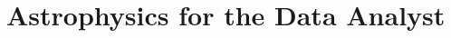 \chapter{Astrophysics for the Data Analyst}\label{ch:T2}

\providecommand{\TwEmriMc}{}\renewcommand{\TwEmriMc}{39.81}
\providecommand{\TwEmrifisco}{}\renewcommand{\TwEmrifisco}{0.4397}
\providecommand{\TwEmriffouryr}{}\renewcommand{\TwEmriffouryr}{13.84}
\providecommand{\TwEmriNcyc}{}\renewcommand{\TwEmriNcyc}{2.787\times10^{6}}
\providecommand{\TwEmriadiab}{}\renewcommand{\TwEmriadiab}{6.839\times10^{-5}}
\providecommand{\TwImriMc}{}\renewcommand{\TwImriMc}{19.39}
\providecommand{\TwImrifisco}{}\renewcommand{\TwImrifisco}{4.391}
\providecommand{\TwImriffouryr}{}\renewcommand{\TwImriffouryr}{21.7}
\providecommand{\TwImriNcyc}{}\renewcommand{\TwImriNcyc}{4.382\times10^{6}}
\providecommand{\TwImriadiab}{}\renewcommand{\TwImriadiab}{9.550\times10^{-4}}
\providecommand{\TwGWMc}{}\renewcommand{\TwGWMc}{28.1}
\providecommand{\TwGWfFive}{}\renewcommand{\TwGWfFive}{15.83}
\providecommand{\TwGWfOne}{}\renewcommand{\TwGWfOne}{28.94}
\providecommand{\TwGWNcyc}{}\renewcommand{\TwGWNcyc}{2.534\times10^{6}}
\providecommand{\TwSpaAmpErr}{}\renewcommand{\TwSpaAmpErr}{3.655}
\providecommand{\TwSpaPhaseRms}{}\renewcommand{\TwSpaPhaseRms}{0.01296}
\providecommand{\TwSpaPsiBand}{}\renewcommand{\TwSpaPsiBand}{168.4}
\providecommand{\TwSpaDuration}{}\renewcommand{\TwSpaDuration}{4.729}
\providecommand{\Twfstar}{}\renewcommand{\Twfstar}{19.09}
\providecommand{\TwASDmin}{}\renewcommand{\TwASDmin}{1.178\times10^{-20}}
\providecommand{\TwfASDmin}{}\renewcommand{\TwfASDmin}{7.256}
\providecommand{\TwfAccOms}{}\renewcommand{\TwfAccOms}{3.077}
\providecommand{\TwfConfLo}{}\renewcommand{\TwfConfLo}{0.4101}
\providecommand{\TwfConfHi}{}\renewcommand{\TwfConfHi}{1.908}
\providecommand{\TwEmriDL}{}\renewcommand{\TwEmriDL}{199.8}
\providecommand{\TwEmriSNR}{}\renewcommand{\TwEmriSNR}{14}
\providecommand{\TwImriSNR}{}\renewcommand{\TwImriSNR}{12.1}
\providecommand{\TwGWlikeSNR}{}\renewcommand{\TwGWlikeSNR}{3.89}
\providecommand{\TwRingAmp}{}\renewcommand{\TwRingAmp}{0.35}
\providecommand{\TwInclAvg}{}\renewcommand{\TwInclAvg}{0.8}
\providecommand{\TwFluxInt}{}\renewcommand{\TwFluxInt}{3.2}
\providecommand{\TwFpNinety}{}\renewcommand{\TwFpNinety}{0.2}
\providecommand{\TwFxNinety}{}\renewcommand{\TwFxNinety}{0.2}
\providecommand{\TwFpSixty}{}\renewcommand{\TwFpSixty}{0.15}
\providecommand{\TwRzero}{}\renewcommand{\TwRzero}{0.3}
\providecommand{\TwRstarRatio}{}\renewcommand{\TwRstarRatio}{0.708}
